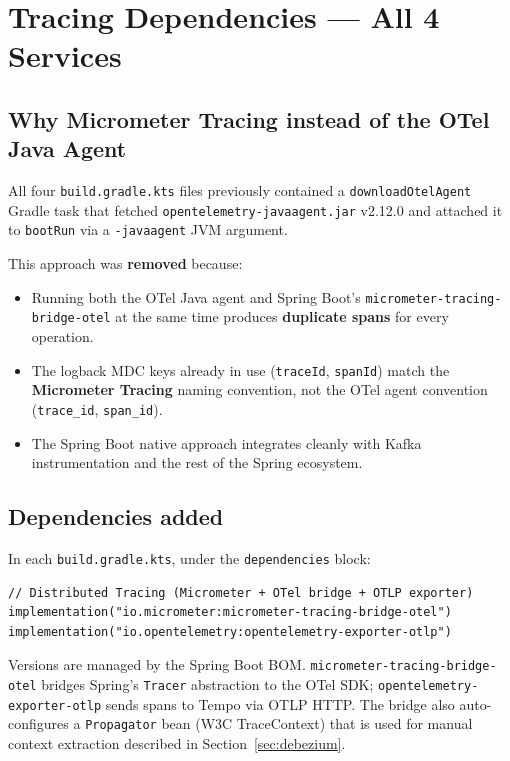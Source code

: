 \documentclass[11pt,a4paper]{article}
\begin{document}
\section{Tracing Dependencies --- All 4 Services}

\subsection{Why Micrometer Tracing instead of the OTel Java Agent}

All four \texttt{build.gradle.kts} files previously contained a
\texttt{downloadOtelAgent} Gradle task that fetched
\texttt{opentelemetry-javaagent.jar} v2.12.0 and attached it to
\texttt{bootRun} via a \texttt{-javaagent} JVM argument.

This approach was \textbf{removed} because:
\begin{itemize}
  \item Running both the OTel Java agent and Spring Boot's
        \texttt{micrometer-tracing-bridge-otel} at the same time produces
        \textbf{duplicate spans} for every operation.
  \item The logback MDC keys already in use (\texttt{traceId}, \texttt{spanId})
        match the \textbf{Micrometer Tracing} naming convention, not the OTel
        agent convention (\texttt{trace\_id}, \texttt{span\_id}).
  \item The Spring Boot native approach integrates cleanly with Kafka
        instrumentation and the rest of the Spring ecosystem.
\end{itemize}

\subsection{Dependencies added}

In each \texttt{build.gradle.kts}, under the \texttt{dependencies} block:

\begin{lstlisting}[style=kotlin, caption={build.gradle.kts --- added to all 4 services}]
// Distributed Tracing (Micrometer + OTel bridge + OTLP exporter)
implementation("io.micrometer:micrometer-tracing-bridge-otel")
implementation("io.opentelemetry:opentelemetry-exporter-otlp")
\end{lstlisting}

Versions are managed by the Spring Boot BOM.
\texttt{micrometer-tracing-bridge-otel} bridges Spring's \texttt{Tracer}
abstraction to the OTel SDK; \texttt{opentelemetry-exporter-otlp} sends spans
to Tempo via OTLP HTTP.  The bridge also auto-configures a
\texttt{Propagator} bean (W3C TraceContext) that is used for manual context
extraction described in Section~\ref{sec:debezium}.
\end{document}
